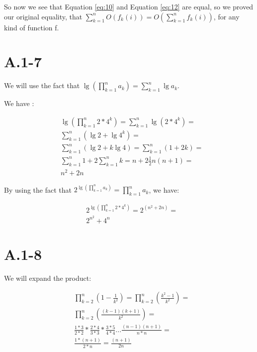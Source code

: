 \documentclass{article}
\begin{document}
So now we see that Equation \ref{eq:10} and Equation \ref{eq:12} are equal, so we proved our original equality, that $\sum_{k=1}^{n}{O(f_{k}(i))} = O(\sum_{k=1}^{n}{f_{k}(i)})$, for any kind of function f.

\section*{A.1-7}

We will use the fact that $\lg{(\prod_{k=1}^{n}{a_k})} = \sum_{k=1}^{n}{\lg{a_k}}$.

We have :

\begin{align*}
    &\lg{(\prod_{k=1}^{n}{2 * 4^k})} = \sum_{k=1}^{n}{\lg{(2 * 4^k)}} = \\
    &\sum_{k=1}^{n}{(\lg 2 + \lg 4^k)} = \\
    &\sum_{k=1}^{n}{(\lg 2 + k\lg 4)} = \sum_{k=1}^{n}{(1 + 2k)} = \\
    &\sum_{k=1}^{n}{1} + 2 \sum_{k=1}^{n}{k} = n + 2 \frac{1}{2}n(n+1) = \\
    &n^2 + 2n 
\end{align*}

By using the fact that $2^{\lg{(\prod_{k=1}^{n}{a_k})}} = \prod_{k=1}^{n}{a_k}$, we have:

\begin{align*}
    &2^{\lg{(\prod_{k=1}^{n}{2 * 4^k})}} = 2^({n^2 + 2n}) = \\
    &2^{n^2} + 4^n
\end{align*}

\section*{A.1-8}

We will expand the product:

\begin{align*}
    &\prod_{k=2}^{n}{(1 - \frac{1}{k^2})} = \prod_{k=2}^{n}{(\frac{k^2 - 1}{k^2})} =\\
    &\prod_{k=2}^{n}{(\frac{(k - 1)(k + 1)}{k^2})} =\\
    &\frac{1 * 3}{2 * 2} * \frac{2 * 4}{3 * 3} * \frac{3 * 5}{4 * 4} . . . \frac{(n-1)(n+1)}{n * n} =\\
    & \frac{1 * (n+1)}{2 * n} = \frac{(n+1)}{2n}
\end{align*}
\end{document}
